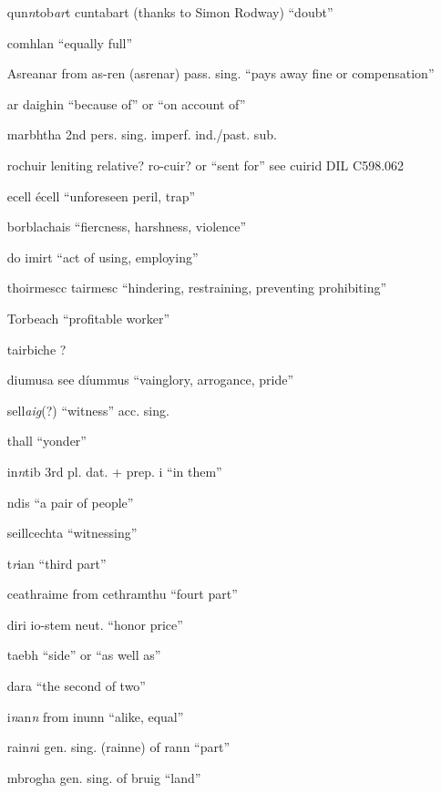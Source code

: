 \documentclass[11pt]{article}
\begin{document}
\begin{enumerate}
  \item[qun\emph{n}tob\emph{ar}t] cuntabart (thanks to Simon Rodway) \enquote{doubt}

  \item[comhlan] \enquote{equally full}

  \item[Asreanar] from as-ren (asrenar) pass. sing. \enquote{pays away fine or compensation}

  \item[ar daighin] \enquote{because of} or \enquote{on account of}
  \item[marbhtha] 2nd pers. sing. imperf. ind./past. sub.
  \item[rochuir] leniting relative? ro-cuir? or \enquote{sent for} see cuirid DIL C598.062
  \item[ecell] \'{e}cell \enquote{unforeseen peril, trap}
  \item[borblachais] \enquote{fiercness, harshness, violence}
  \item[do imirt] \enquote{act of using, employing}
  \item[thoirmescc] tairmesc \enquote{hindering, restraining, preventing prohibiting}
  \item[Torbeach] \enquote{profitable worker}
  \item[tairbiche] ? 
  \item[diumusa] see d\'{i}ummus \enquote{vainglory, arrogance, pride}
  \item[sell\emph{aig}(?)] \enquote{witness} acc. sing.
  \item[thall] \enquote{yonder}
  \item[in\emph{n}tib] 3rd pl. dat. + prep. i \enquote{in them}
  \item[ndis] \enquote{a pair of people}
  \item[seillcechta] \enquote{witnessing}
  \item[t\emph{r}ian] \enquote{third part}
  \item[ceathraime] from cethramthu \enquote{fourt part}
  \item[diri] io-stem neut. \enquote{honor price}
  \item[taebh] \enquote{side} or \enquote{as well as}
  \item[dara] \enquote{the second of two}
  \item[i\emph{n}an\emph{n}] from inunn \enquote{alike, equal}
  \item[rain\emph{n}i] gen. sing. (rainne) of rann \enquote{part}
  \item[mbrogha] gen. sing. of bruig \enquote{land}

\end{enumerate}
\end{document}
